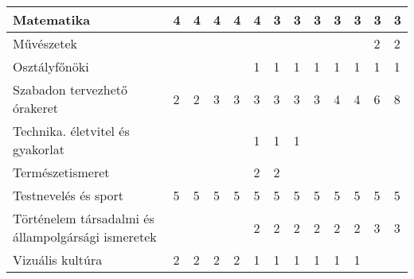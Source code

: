 \begin{landscape}
\begin{table}[]
\begin{tabular}{l|l|l|l|l|l|l|l|l|l|l|l|l}
    Matematika                                          & 4                                     & 4           & 4           & 4           & 4           & 3           & 3           & 3           & 3           & 3           & 3           & 3           \\ \hline
    Művészetek                                          &                                       &             &             &             &             &             &             &             &             &             & 2           & 2           \\ \hline
    Osztályfőnöki                                       &                                       &             &             &             & 1           & 1           & 1           & 1           & 1           & 1           & 1           & 1           \\ \hline
    Szabadon tervezhető órakeret                        & 2                                     & 2           & 3           & 3           & 3           & 3           & 3           & 3           & 4           & 4           & 6           & 8           \\ \hline
    Technika. életvitel és gyakorlat                    &                                       &             &             &             & 1           & 1           & 1           &             &             &             &             &             \\ \hline
    Természetismeret                                    &                                       &             &             &             & 2           & 2           &             &             &             &             &             &             \\ \hline
    Testnevelés és sport                                & 5                                     & 5           & 5           & 5           & 5           & 5           & 5           & 5           & 5           & 5           & 5           & 5           \\ \hline
  Történelem társadalmi és állampolgársági ismeretek&                                       &             &             &             & 2           & 2           & 2           & 2           & 2           & 2           & 3           & 3           \\ \hline
    Vizuális kultúra                                    & 2                                     & 2           & 2           & 2           & 1           & 1           & 1           & 1           & 1           & 1           &             &             \\ \hline

\end{tabular}
\end{table}
\end{landscape}
